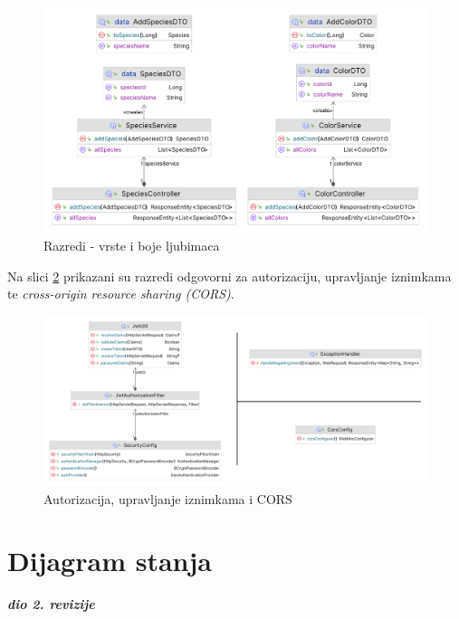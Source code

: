 			\begin{figure}[H]
				\includegraphics[scale=0.3]{slike/class_species_color.PNG} 
				\centering
				\caption{Razredi - vrste i boje ljubimaca}
				\label{class_species_color}
			\end{figure}
			
			Na slici \ref{class_security_exc_cors} prikazani su razredi odgovorni za autorizaciju, upravljanje iznimkama te \textit{cross-origin resource sharing (CORS)}.
			
			\begin{figure}[H]
				\includegraphics[scale=0.3]{slike/class_security_exc_cors.PNG} 
				\centering
				\caption{Autorizacija, upravljanje iznimkama i CORS}
				\label{class_security_exc_cors}
			\end{figure}
			
			\eject
		
		\section{Dijagram stanja}
			
			
			\textbf{\textit{dio 2. revizije}}\\
			
